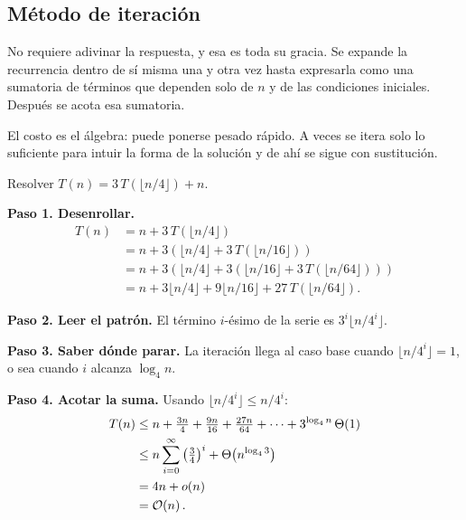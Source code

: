 \documentclass[11pt,letterpaper]{article}
\begin{document}

\subsection*{Método de iteración}

No requiere adivinar la respuesta, y esa es toda su gracia. Se expande
la recurrencia dentro de sí misma una y otra vez hasta expresarla como
una sumatoria de términos que dependen solo de $n$ y de las
condiciones iniciales. Después se acota esa sumatoria.

El costo es el álgebra: puede ponerse pesado rápido. A veces se itera
solo lo suficiente para intuir la forma de la solución y de ahí se
sigue con sustitución.

\begin{ejemplo}
  Resolver $T(n) = 3\,T(\lfloor n/4 \rfloor) + n$.

  \textbf{Paso 1. Desenrollar.}
  \begin{align*}
    T(n) &= n + 3\,T(\lfloor n/4 \rfloor) \\
         &= n + 3\left(\lfloor n/4 \rfloor
            + 3\,T(\lfloor n/16 \rfloor)\right) \\
         &= n + 3\left(\lfloor n/4 \rfloor + 3\left(
            \lfloor n/16 \rfloor
            + 3\,T(\lfloor n/64 \rfloor)\right)\right) \\
         &= n + 3\lfloor n/4 \rfloor + 9\lfloor n/16 \rfloor
            + 27\,T(\lfloor n/64 \rfloor) .
  \end{align*}

  \textbf{Paso 2. Leer el patrón.} El término $i$-ésimo de la serie es
  $3^i \lfloor n/4^i \rfloor$.

  \textbf{Paso 3. Saber dónde parar.} La iteración llega al caso base
  cuando $\lfloor n/4^i \rfloor = 1$, o sea cuando $i$ alcanza
  $\log_4 n$.

  \textbf{Paso 4. Acotar la suma.} Usando
  $\lfloor n/4^i \rfloor \leq n/4^i$:
  \begin{align*}
    T(n) &\leq n + \tfrac{3n}{4} + \tfrac{9n}{16}
            + \tfrac{27n}{64} + \cdots
            + 3^{\log_4 n}\,\Theta\!\left(1\right) \\
         &\leq n \sum_{i=0}^{\infty}
            \left(\tfrac{3}{4}\right)^{i}
            + \Theta\!\left(n^{\log_4 3}\right) \\
         &= 4n + o\!\left(n\right) \\
         &= \mathcal{O}\!\left(n\right) .
  \end{align*}
\end{ejemplo}
\end{document}
